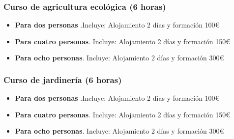 \subsubsection{Curso de agricultura ecológica (6 horas)}
\begin{itemize}
\item \textbf{Para dos personas} .Incluye: Alojamiento 2 días y formación 100\euro
\item \textbf{Para cuatro personas}. Incluye: Alojamiento 2 días y formación 150\euro
\item \textbf{Para ocho personas}. Incluye: Alojamiento 2 días y formación 300\euro
\end{itemize}

\subsubsection{Curso de jardinería (6 horas)}
\begin{itemize}
\item \textbf{Para dos personas} .Incluye: Alojamiento 2 días y formación 100\euro
\item \textbf{Para cuatro personas}. Incluye: Alojamiento 2 días y formación 150\euro
\item \textbf{Para ocho personas}. Incluye: Alojamiento 2 días y formación 300\euro
\end{itemize}
